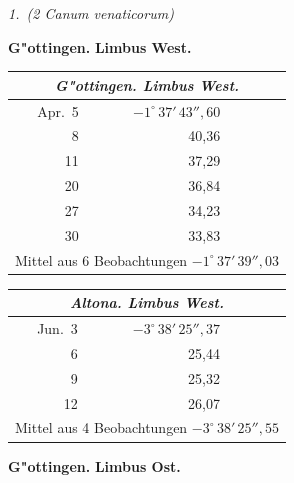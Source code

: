 \documentclass[12pt,a4paper]{article}
\theoremstyle{plain}
\theoremstyle{definition}
\theoremstyle{remark}
\begin{document}
\begin{center}
\textit{1.~(2 Canum venaticorum)}
\end{center}

\vspace{0.2cm}
\noindent
\textbf{G"ottingen.}
\hspace{2cm}
\textbf{Limbus West.}

\begin{small}
\begin{tabular}{@{}r|r|r|r|r@{}}
\multicolumn{5}{c}{\textit{G"ottingen. Limbus West.}}\\
\hline
\rule{0pt}{1em}Apr.~5 & $-1^\circ\,37'\,43''{,}60$ & & & \\
8 & 40,36 & & & \\
11 & 37,29 & & & \\
20 & 36,84 & & & \\
27 & 34,23 & & & \\
30 & 33,83 & & & \\
\hline
\multicolumn{5}{l}{Mittel aus 6 Beobachtungen $-1^\circ\,37'\,39''{,}03$}
\end{tabular}
\hfill
\begin{tabular}{@{}r|r|r|r|r@{}}
\multicolumn{5}{c}{\textit{Altona. Limbus West.}}\\
\hline
\rule{0pt}{1em}Jun.~3 & $-3^\circ\,38'\,25''{,}37$ & & & \\
\phantom{0}6 & 25,44 & & & \\
\phantom{0}9 & 25,32 & & & \\
12 & 26,07 & & & \\
\hline
\multicolumn{5}{l}{Mittel aus 4 Beobachtungen $-3^\circ\,38'\,25''{,}55$}
\end{tabular}
\end{small}

\vspace{0.5cm}
\noindent
\textbf{G"ottingen.}
\hspace{2cm}
\textbf{Limbus Ost.}
\end{document}
